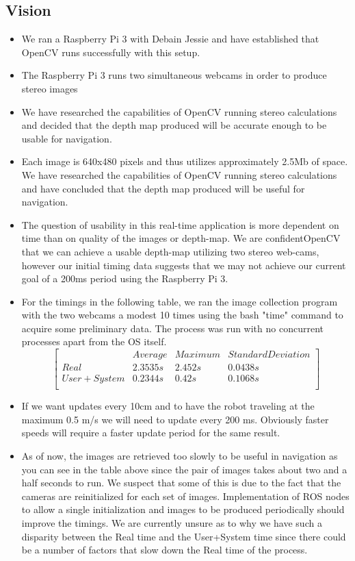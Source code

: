 \documentclass[11pt]{amsart}
\begin{document}
\subsection{Vision}  
\begin{itemize}
\item We ran a Raspberry Pi 3 with Debain Jessie and have established that OpenCV runs successfully with this setup.
\item The Raspberry Pi 3 runs two simultaneous webcams in order to produce stereo images
\item We have researched the capabilities of OpenCV running stereo calculations and decided that the depth map produced will be accurate enough to be usable for navigation.
\item Each image is 640x480 pixels and thus utilizes approximately 2.5Mb of space.  We have researched the capabilities of OpenCV running stereo calculations and have concluded that the depth map produced will be useful for navigation.
\item The question of usability in this real-time application is more dependent on time than on quality of the images or depth-map.  We are confidentOpenCV that we can achieve a usable depth-map utilizing two stereo web-cams, however our initial timing data suggests that we may not achieve our current goal of a 200ms period using the Raspberry Pi 3.  
\item For the timings in the following table, we ran the image collection program with the two webcams a modest 10 times using the bash "time" command to acquire some preliminary data.  The process was run with no concurrent processes apart from the OS itself.
\[
\begin{bmatrix}
& Average & Maximum & Standard Deviation \\
Real & 2.3535s & 2.452s & 0.0438s \\
User + System & 0.2344s & 0.42s & 0.1068s \\
\end{bmatrix} 
\]
\item If we want updates every 10cm and to have the robot traveling at the maximum 0.5 m/s we will need to update every 200 ms. Obviously faster speeds will require a faster update period for the same result.
\item As of now, the images are retrieved too slowly to be useful in navigation as you can see in the table above since the pair of images takes about two and a half seconds to run.  We suspect that some of this is due to the fact that the cameras are reinitialized for each set of images.  Implementation of ROS nodes to allow a single initialization and images to be produced periodically should improve the timings. We are currently unsure as to why we have such a disparity between the Real time and the User+System time since there could be a number of factors that slow down the Real time of the process.

\end{itemize}
\end{document}
